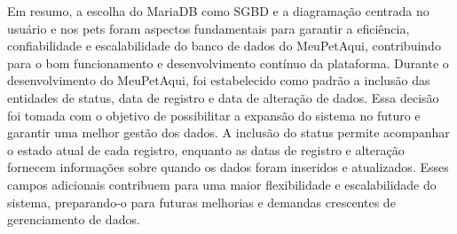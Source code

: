 Em resumo, a escolha do MariaDB como SGBD e a diagramação centrada no usuário e nos pets foram aspectos fundamentais para garantir a eficiência, confiabilidade e escalabilidade do banco de dados do MeuPetAqui, contribuindo para o bom funcionamento e desenvolvimento contínuo da plataforma. Durante o desenvolvimento do MeuPetAqui, foi estabelecido como padrão a inclusão das entidades de status, data de registro e data de alteração de dados. Essa decisão foi tomada com o objetivo de possibilitar a expansão do sistema no futuro e garantir uma melhor gestão dos dados. A inclusão do status permite acompanhar o estado atual de cada registro, enquanto as datas de registro e alteração fornecem informações sobre quando os dados foram inseridos e atualizados. Esses campos adicionais contribuem para uma maior flexibilidade e escalabilidade do sistema, preparando-o para futuras melhorias e demandas crescentes de gerenciamento de dados.

